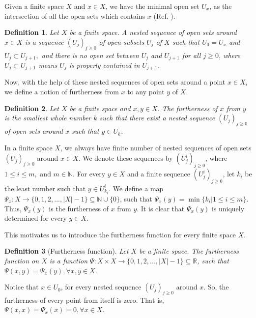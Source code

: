 \documentclass[12pt]{amsart}
\newtheorem{definition}{Definition}[section]
\begin{document}
	Given a finite space $X$ and $x\in X$, we have the minimal open set $U_x$, as the intersection of all the open sets which contains $x$ (Ref.   \cite{Barmak}).
	
	\begin{definition}
		Let $X$ be a finite space. A nested sequence of open sets around $x\in X$ is a sequence $(U_j)_{j\geq 0}$ of open subsets $U_j$ of $X$ such that  $U_0=U_x$ and $U_j\subset U_{j+1},$ and there is no open set between $U_j$ and $U_{j+1}$ for all $j\geq 0$, where $U_j\subset U_{j+1}$ means $U_j$ is properly contained in $U_{j+1}$.
	\end{definition}
	
	Now, with the help of these nested sequences of open sets around a point $x\in X$, we define a notion of furtherness from $x$ to any point $y$ of $X$.
	
	\begin{definition}
		Let $X$ be a finite space and $x,y\in X$. The furtherness of $x$ from $y$ is the smallest whole number $k$ such that there exist a nested sequence $(U_j)_{j\geq0}$ of open sets around $x$ such that $y\in U_k$.
	\end{definition}
	
	
	In a finite space $X$, we always have finite number of nested sequences of open sets $(U_j)_{j\geq 0}$ around $x\in X$. We denote these sequences by $(U^i_j)_{j\geq 0}$, where $1\leq i\leq m, \text{ and } m\in \mathbb{N}$. For every $y\in X$ and a finite sequence $(U^i_j)_{j\geq 0}$, let $k_i$ be the least number such that $y\in U^i_{k_{i}}$. We define a map $\Psi_x: X\longrightarrow \{0,1,2,...,|X|-1\}\subseteq\mathbb{N}\cup \{0\}$, such that $\Psi_x(y)=\min\{k_i|1\leq i\leq m\}$.  Thus, $\Psi_{x}(y)$ is the furtherness of $x$ from $y$. It is clear that $\Psi_x(y)$ is uniquely determined for every $y\in X$. \par 
	
	This motivates us to introduce the furtherness function for every finite space $X$. 
	
	\begin{definition}[Furtherness function]
		Let $X$ be a finite space. The furtherness function on $X$ is a function $\Psi:X\times X\longrightarrow \{0,1,2,...,|X|-1\}\subseteq\mathbb{R}$, such that $\Psi(x,y)=\Psi_{x}(y),\forall x,y\in X$.
	\end{definition}
	
	
	Notice that $x\in U_0$, for every nested sequence $(U_j)_{j\geq 0}$ around $x$. So, the furtherness of every point from itself is zero. That is, $\Psi(x,x)=\Psi_{x}(x)=0,\forall x\in X.$\\
	
\end{document}
